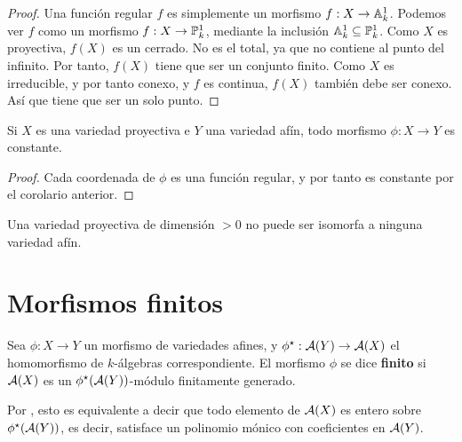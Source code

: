 \documentclass[ACGA.tex]{subfiles}
\begin{document}
\begin{proof}
 Una función regular $f$ es simplemente un morfismo $f:X\to\mathbb{A}^1_k$. Podemos ver $f$ como un morfismo $f:X\to\mathbb{P}^1_k$, mediante la inclusión $\mathbb{A}^1_k\subseteq\mathbb{P}^1_k$. Como $X$ es proyectiva, $f(X)$ es un cerrado. No es el total, ya que no contiene al punto del infinito. Por tanto, $f(X)$ tiene que ser un conjunto finito. Como $X$ es irreducible, y por tanto conexo, y $f$ es continua, $f(X)$ también debe ser conexo. Así que tiene que ser un solo punto.
\end{proof}

\begin{coro}
 Si $X$ es una variedad proyectiva e $Y$ una variedad afín, todo morfismo $\phi:X\to Y$ es constante.
\end{coro}

\begin{proof}
 Cada coordenada de $\phi$ es una función regular, y por tanto es constante por el corolario anterior.
\end{proof}

\begin{coro}\label{proyectivanoafin}
 Una variedad proyectiva de dimensión $>0$ no puede ser isomorfa a ninguna variedad afín.
\end{coro}

\section{Morfismos finitos}

\begin{defi}
 Sea $\phi:X\to Y$ un morfismo de variedades afines, y $\phi^\star:\mathcal{A}(Y)\to\mathcal{A}(X)$ el homomorfismo de $k$-álgebras correspondiente. El morfismo $\phi$ se dice {\bf finito} si $\mathcal{A}(X)$ es un $\phi^\star(\mathcal{A}(Y))$-módulo finitamente generado.
\end{defi}

Por \cite[Proposición 5.1]{am}, esto es equivalente a decir que todo elemento de $\mathcal{A}(X)$ es entero sobre $\phi^\star(\mathcal{A}(Y))$, es decir, satisface un polinomio mónico con coeficientes en $\mathcal{A}(Y)$.
\end{document}
